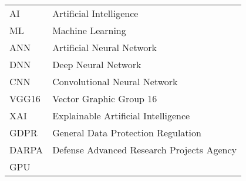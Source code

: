 %
%
%
%

\begin{acronyms}

\renewcommand{\arraystretch}{1.5}
\setlength{\tabcolsep}{3mm}
{\begin {tabular}{ll}

AI  &    Artificial Intelligence    \\
ML  &   Machine Learning    \\
ANN &   Artificial Neural Network   \\
DNN &   Deep Neural Network \\
CNN &   Convolutional Neural Network    \\
VGG16   &   Vector Graphic Group 16 \\
XAI &   Explainable Artificial Intelligence \\
GDPR    &   General Data Protection Regulation  \\
DARPA   &   Defense Advanced Research Projects Agency   \\
GPU &   

\end {tabular}}

\end{acronyms}

